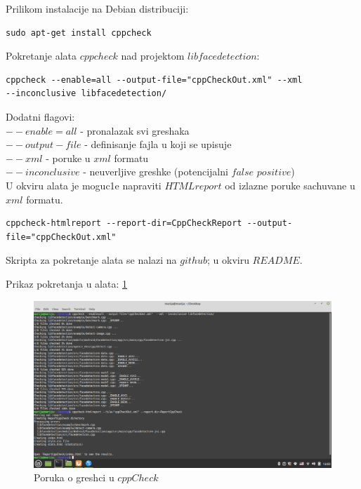 \documentclass{article}
\begin{document}
Prilikom instalacije na Debian distribuciji:
\selectfont
\begin{verbatim}
sudo apt-get install cppcheck
\end{verbatim}

\selectfont
Pokretanje alata $cppcheck$ nad projektom $libfacedetection$: 

\selectfont
\begin{verbatim}
cppcheck --enable=all --output-file="cppCheckOut.xml" --xml
--inconclusive libfacedetection/
\end{verbatim}

\selectfont
Dodatni flagovi:\\
$--enable = all$ - pronalazak svi greshaka \\
$--output-file$ - definisanje fajla u koji se upisuje \\
$--xml$ - poruke u $xml$ formatu \\
$--inconclusive$ - neuverljive greshke (potencijalni $false$ $positive$)
\\
U okviru alata je moguc1e napraviti $HTML report$ od izlazne poruke sachuvane u $xml$ formatu. 

\selectfont
\begin{verbatim}
cppcheck-htmlreport --report-dir=CppCheckReport --output-file="cppCheckOut.xml" 
\end{verbatim}

\selectfont

Skripta za pokretanje alata se nalazi na $github$; u okviru $README$.

Prikaz pokretanja u alata: \ref{msg:cppcheck}

\begin{figure}[H]
    \centering
    \includegraphics[width=12cm]{img/cppCheck/cppCheckTerminal.png}
    \caption{Poruka o gresh\-ci u $cppCheck$}
    \label{msg:cppcheck}
\end{figure}
\end{document}
